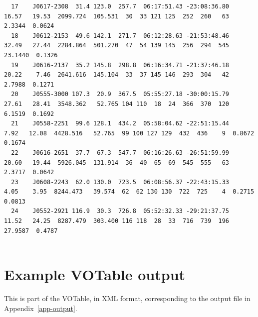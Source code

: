 \documentclass[12pt]{article}
\begin{document}
\begin{landscape}
{\begin{verbatim}
  17    J0617-2308  31.4 123.0  257.7  06:17:51.43 -23:08:36.80   16.57   19.53  2099.724  105.531  30  33 121 125  252  260   63  2.3344  0.0624
  18    J0612-2153  49.6 142.1  271.7  06:12:28.63 -21:53:48.46   32.49   27.44  2284.864  501.270  47  54 139 145  256  294  545 23.1440  0.1326
  19    J0616-2137  35.2 145.8  298.8  06:16:34.71 -21:37:46.18   20.22    7.46  2641.616  145.104  33  37 145 146  293  304   42  2.7988  0.1271
  20    J0555-3000 107.3  20.9  367.5  05:55:27.18 -30:00:15.79   27.61   28.41  3548.362   52.765 104 110  18  24  366  370  120  6.1519  0.1692
  21    J0558-2251  99.6 128.1  434.2  05:58:04.62 -22:51:15.44    7.92   12.08  4428.516   52.765  99 100 127 129  432  436    9  0.8672  0.1674
  22    J0616-2651  37.7  67.3  547.7  06:16:26.63 -26:51:59.99   20.60   19.44  5926.045  131.914  36  40  65  69  545  555   63  2.3717  0.0642
  23    J0608-2243  62.0 130.0  723.5  06:08:56.37 -22:43:15.33    4.05    3.95  8244.473   39.574  62  62 130 130  722  725    4  0.2715  0.0813
  24    J0552-2921 116.9  30.3  726.8  05:52:32.33 -29:21:37.75   11.52   24.25  8287.479  303.400 116 118  28  33  716  739  196 27.9587  0.4787


  \end{verbatim}
}


\newpage
\section{Example VOTable output}
\label{app-votable}
This is part of the VOTable, in XML format, corresponding to the
output file in Appendix~\ref{app-output}.


\end{landscape}
\end{document}
